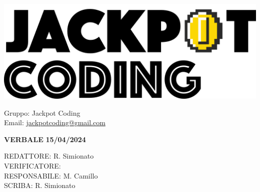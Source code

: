 \documentclass[5pt]{article}
\begin{document}
\begin{minipage}[t]{0.50\textwidth}
    \begin{flushleft}
        \hspace{10pt}
        \includegraphics[scale=0.65]{jackpot-logo.png} 
    \end{flushleft}
\end{minipage}
\hspace{-60pt} %
\begin{flushright}
    \begin{minipage}[t]{0.50\textwidth}
        \begin{flushright}
            Gruppo: {\Large Jackpot Coding}\\
            Email: \href{mailto:jackpotcoding@gmail.com}{jackpotcoding@gmail.com}
        \end{flushright}
    \end{minipage}
\end{flushright}

\vspace{24pt}

\begin{center}
    \textbf{\large VERBALE }
    \textbf{\large 15/04/2024} \\
\end{center}

\vspace{13pt}

\begin{flushleft}
    \begin{spacing}{1.5}
        REDATTORE:  R. Simionato\\%
        VERIFICATORE:   \\%
        RESPONSABILE:  M. Camillo\\%
        \vspace{7pt}
        SCRIBA: R. Simionato\\%
        \vspace{7pt}
    \end{spacing}
\end{flushleft}
\end{document}
